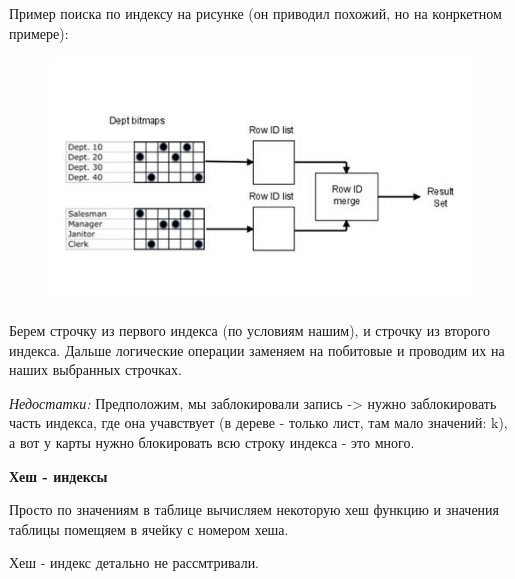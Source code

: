 Пример поиска по индексу на рисунке (он приводил похожий, но на конркетном примере): 
\begin{figure}[H]
	\centering
	\includegraphics[scale = 0.3]{4/Map.jpeg}
\end{figure}

Берем строчку из первого индекса (по условиям нашим), и строчку из второго индекса. Дальше логические операции заменяем на побитовые и проводим их на наших выбранных строчках. 

\textit{Недостатки:} Предположим, мы заблокировали запись -> нужно заблокировать часть индекса, где она учавствует (в дереве - только лист, там мало значений: k), а вот у карты нужно блокировать всю строку индекса - это много.

\textbf{Хеш - индексы} 

Просто по значениям в таблице вычисляем некоторую хеш функцию и значения таблицы помещяем в ячейку с номером хеша. 

Хеш - индекс детально не рассмтривали. 